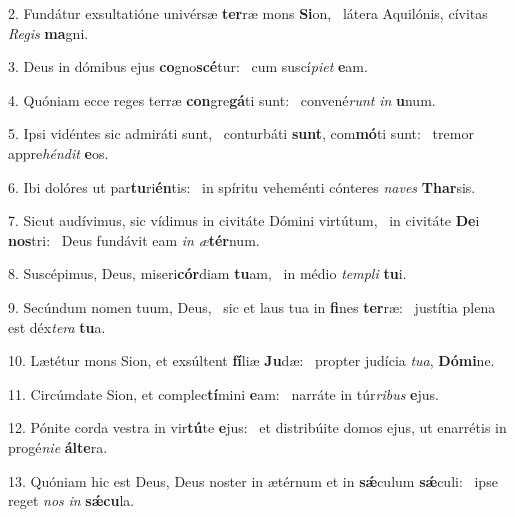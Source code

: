 2. Fundátur exsultatióne univérsæ \textbf{ter}ræ mons \textbf{Si}on, \ast\  látera Aquilónis, cívitas \textit{Re}\textit{gis} \textbf{ma}gni.\

3. Deus in dómibus ejus \textbf{co}gno\textbf{scé}tur: \ast\  cum suscí\textit{pi}\textit{et} \textbf{e}am.\

4. Quóniam ecce reges terræ \textbf{con}gre\textbf{gá}ti sunt: \ast\  convené\textit{runt} \textit{in} \textbf{u}num.\

5. Ipsi vidéntes sic admiráti sunt, \dag\  conturbáti \textbf{sunt}, com\textbf{mó}ti sunt: \ast\  tremor appre\textit{hén}\textit{dit} \textbf{e}os.\

6. Ibi dolóres ut par\textbf{tu}ri\textbf{én}tis: \ast\  in spíritu veheménti cónteres \textit{na}\textit{ves} \textbf{Thar}sis.\

7. Sicut audívimus, sic vídimus in civitáte Dómini virtútum, \dag\  in civitáte \textbf{De}i \textbf{nos}tri: \ast\  Deus fundávit eam \textit{in} \textit{æ}\textbf{tér}num.\

8. Suscépimus, Deus, miseri\textbf{cór}diam \textbf{tu}am, \ast\  in médio \textit{tem}\textit{pli} \textbf{tu}i.\

9. Secúndum nomen tuum, Deus, \dag\  sic et laus tua in \textbf{fi}nes \textbf{ter}ræ: \ast\  justítia plena est déx\textit{te}\textit{ra} \textbf{tu}a.\

10. Lætétur mons Sion, et exsúltent \textbf{fí}liæ \textbf{Ju}dæ: \ast\  propter judícia \textit{tu}\textit{a}, \textbf{Dó}\textbf{mi}ne.\

11. Circúmdate Sion, et complec\textbf{tí}mini \textbf{e}am: \ast\  narráte in túr\textit{ri}\textit{bus} \textbf{e}jus.\

12. Pónite corda vestra in vir\textbf{tú}te \textbf{e}jus: \ast\  et distribúite domos ejus, ut enarrétis in progé\textit{ni}\textit{e} \textbf{ál}\textbf{te}ra.\

13. Quóniam hic est Deus, Deus noster in ætérnum et in \textbf{sǽ}culum \textbf{sǽ}culi: \ast\  ipse reget \textit{nos} \textit{in} \textbf{sǽ}\textbf{cu}la.\

